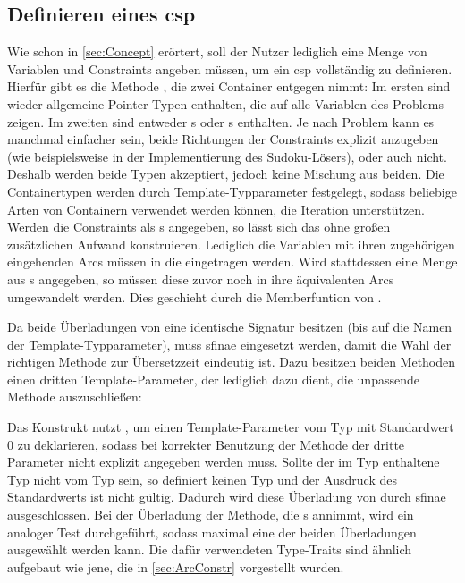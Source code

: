 \subsection{Definieren eines \ac*{csp}}
Wie schon in \cref{sec:Concept} erörtert, soll der Nutzer lediglich eine Menge von Variablen und Constraints angeben müssen, um ein \ac*{csp} vollständig zu definieren. Hierfür
gibt es die Methode , die zwei Container entgegen nimmt: Im ersten sind wieder allgemeine Pointer-Typen enthalten, die auf alle Variablen des Problems zeigen.
Im zweiten sind entweder s oder s enthalten. Je nach Problem kann es manchmal einfacher sein, beide Richtungen der Constraints explizit
anzugeben (wie beispielsweise in der Implementierung des Sudoku-Lösers), oder auch nicht. Deshalb werden beide Typen akzeptiert, jedoch keine Mischung aus beiden. Die Containertypen
werden durch Template-Typparameter festgelegt, sodass beliebige Arten von Containern verwendet werden können, die Iteration unterstützen. Werden die Constraints als
s angegeben, so lässt sich das  ohne großen zusätzlichen Aufwand konstruieren. Lediglich die Variablen mit ihren zugehörigen eingehenden Arcs
müssen in die  eingetragen werden. Wird stattdessen eine Menge aus s angegeben, so müssen diese zuvor noch in ihre äquivalenten
Arcs umgewandelt werden. Dies geschieht durch die Memberfuntion  von .

Da beide Überladungen von  eine identische Signatur besitzen (bis auf die Namen der Template-Typparameter), muss \ac*{sfinae} eingesetzt werden, damit
die Wahl der richtigen Methode zur Übersetzzeit eindeutig ist. Dazu besitzen beiden Methoden einen dritten Template-Parameter, der lediglich dazu dient, die unpassende Methode
auszuschließen:

Das Konstrukt nutzt , um einen Template-Parameter vom Typ  mit Standardwert 0 zu deklarieren, sodass bei korrekter Benutzung der Methode
der dritte Parameter nicht explizit angegeben werden muss. Sollte der im Typ  enthaltene Typ nicht vom Typ  sein, so definiert
 keinen Typ und der Ausdruck des Standardwerts ist nicht gültig. Dadurch wird diese Überladung von  durch \ac*{sfinae}
ausgeschlossen. Bei der Überladung der Methode, die s annimmt, wird ein analoger Test durchgeführt, sodass maximal eine der beiden Überladungen ausgewählt
werden kann. Die dafür verwendeten Type-Traits sind ähnlich aufgebaut wie jene, die in \cref{sec:ArcConstr} vorgestellt wurden.